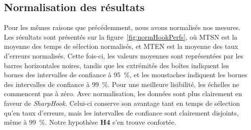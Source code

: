 	\subsection{Normalisation des résultats}
	Pour les mêmes raisons que précédemment, nous avons normalisés nos mesures. Les résultats sont présentés sur la figure~\ref{fig:normHookPerfs}, où MTSN est la moyenne des temps de sélection normalisés, et MTEN est la moyenne des taux d'erreurs normalisés. Cette fois-ci, les valeurs moyennes sont représentées par les barres horizontales noires, tandis que les extrémités des \og boîtes \fg{} indiquent les bornes des intervalles de confiance à 95~\%{}, et les \og moustaches \fg{} indiquent les bornes des intervalles de confiance à 99~\%{}. Pour une meilleure lisibilité, les échelles ne commencent pas à zéro. Avec normalisation, les données sont plus clairement en faveur de \emph{SharpHook}. Celui-ci conserve son avantage tant en temps de sélection qu'en taux d'erreurs, mais les intervalles de confiance sont clairement disjoints, même à 99~\%{}. Notre hypothèse \textbf{H4} s'en trouve confortée.


